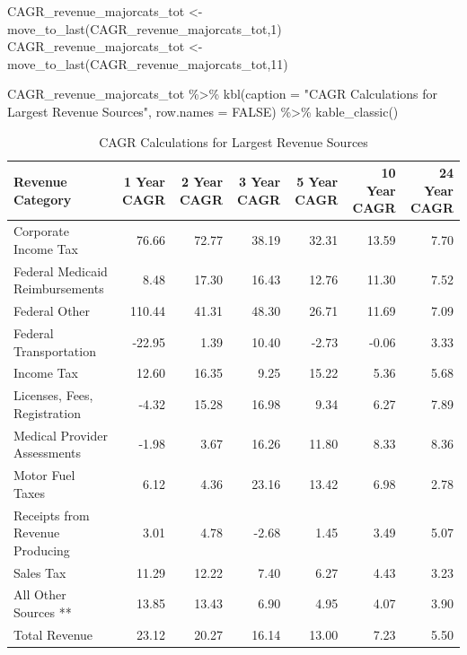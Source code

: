 \documentclass[
  letterpaper,
  DIV=11,
  numbers=noendperiod]{scrreport}
\newenvironment{Shaded}{\begin{snugshade}}{\end{snugshade}}
\newcommand{\AttributeTok}[1]{\textcolor[rgb]{0.40,0.45,0.13}{#1}}
\newcommand{\ConstantTok}[1]{\textcolor[rgb]{0.56,0.35,0.01}{#1}}
\newcommand{\DecValTok}[1]{\textcolor[rgb]{0.68,0.00,0.00}{#1}}
\newcommand{\FunctionTok}[1]{\textcolor[rgb]{0.28,0.35,0.67}{#1}}
\newcommand{\NormalTok}[1]{\textcolor[rgb]{0.00,0.23,0.31}{#1}}
\newcommand{\OtherTok}[1]{\textcolor[rgb]{0.00,0.23,0.31}{#1}}
\newcommand{\SpecialCharTok}[1]{\textcolor[rgb]{0.37,0.37,0.37}{#1}}
\newcommand{\StringTok}[1]{\textcolor[rgb]{0.13,0.47,0.30}{#1}}
\begin{document}
\begin{Shaded}
\begin{Highlighting}[]
\NormalTok{CAGR\_revenue\_majorcats\_tot }\OtherTok{\textless{}{-}} \FunctionTok{move\_to\_last}\NormalTok{(CAGR\_revenue\_majorcats\_tot,}\DecValTok{1}\NormalTok{)}
\NormalTok{CAGR\_revenue\_majorcats\_tot }\OtherTok{\textless{}{-}} \FunctionTok{move\_to\_last}\NormalTok{(CAGR\_revenue\_majorcats\_tot,}\DecValTok{11}\NormalTok{)}

\NormalTok{CAGR\_revenue\_majorcats\_tot }\SpecialCharTok{\%\textgreater{}\%} 
  \FunctionTok{kbl}\NormalTok{(}\AttributeTok{caption =} \StringTok{"CAGR Calculations for Largest Revenue Sources"}\NormalTok{, }\AttributeTok{row.names =} \ConstantTok{FALSE}\NormalTok{) }\SpecialCharTok{\%\textgreater{}\%} 
     \FunctionTok{kable\_classic}\NormalTok{() }
\end{Highlighting}
\end{Shaded}

\begin{table}

\caption{CAGR Calculations for Largest Revenue Sources}
\centering
\begin{tabular}[t]{l|r|r|r|r|r|r}
\hline
Revenue Category & 1 Year CAGR & 2 Year CAGR & 3 Year CAGR & 5 Year CAGR & 10 Year CAGR & 24 Year CAGR\\
\hline
Corporate Income Tax & 76.66 & 72.77 & 38.19 & 32.31 & 13.59 & 7.70\\
\hline
Federal Medicaid Reimbursements & 8.48 & 17.30 & 16.43 & 12.76 & 11.30 & 7.52\\
\hline
Federal Other & 110.44 & 41.31 & 48.30 & 26.71 & 11.69 & 7.09\\
\hline
Federal Transportation & -22.95 & 1.39 & 10.40 & -2.73 & -0.06 & 3.33\\
\hline
Income Tax & 12.60 & 16.35 & 9.25 & 15.22 & 5.36 & 5.68\\
\hline
Licenses, Fees, Registration & -4.32 & 15.28 & 16.98 & 9.34 & 6.27 & 7.89\\
\hline
Medical Provider Assessments & -1.98 & 3.67 & 16.26 & 11.80 & 8.33 & 8.36\\
\hline
Motor Fuel Taxes & 6.12 & 4.36 & 23.16 & 13.42 & 6.98 & 2.78\\
\hline
Receipts from Revenue Producing & 3.01 & 4.78 & -2.68 & 1.45 & 3.49 & 5.07\\
\hline
Sales Tax & 11.29 & 12.22 & 7.40 & 6.27 & 4.43 & 3.23\\
\hline
All Other Sources ** & 13.85 & 13.43 & 6.90 & 4.95 & 4.07 & 3.90\\
\hline
Total Revenue & 23.12 & 20.27 & 16.14 & 13.00 & 7.23 & 5.50\\
\hline
\end{tabular}
\end{table}
\end{document}
